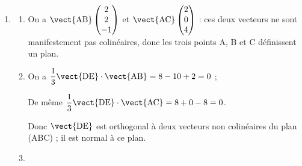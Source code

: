 \begin{enumerate}
\begin{enumerate}
$\left\{\begin{array}{l !{=} r}
x&0+4t\\
y&0-5t\\
z& 0-2t
\end{array}\right. \quad\text{avec}\: t \in \R$
soit
$\left\{\begin{array}{l !{=} r}
x&4t\\
y&-5t\\
z& -2t
\end{array}\right. \quad\text{avec}\: t \in \R$

		\item %
		F$(1,36~;~-1,7~;~-0,7) \in\Delta' \iff \left\{\begin{array}{l c l}
1,36&=&\phantom{-}4t\\
-1,7&=&-5t \quad\text{avec}\: t \in \R\\
-0,7&=& -2t
\end{array}\right.$

Les deux premières équations donnent $t = 0,34$ et la dernière $t = 0,35$. \\
Donc F $\notin \Delta$.
	\end{enumerate}	
\item
	\begin{enumerate}
		\item %
		On a $\vect{\text{AB}}\begin{pmatrix}2\\2\\-1\end{pmatrix}$ et $\vect{\text{AC}}\begin{pmatrix}2\\0\\4\end{pmatrix}$ : ces deux vecteurs ne sont manifestement pas colinéaires, donc les trois points A, B et C définissent un plan.
		\item %
On a $\dfrac13\vect{\text{DE}} \cdot \vect{\text{AB}} = 8 - 10 + 2 = 0$ ;

De même $\dfrac13\vect{\text{DE}} \cdot \vect{\text{AC}} = 8 + 0 - 8 = 0$.

Donc $\vect{\text{DE}}$ est orthogonal à deux vecteurs non colinéaires du plan (ABC) ; il est normal à ce plan.

		\item %
		

\end{enumerate}
\end{enumerate}
